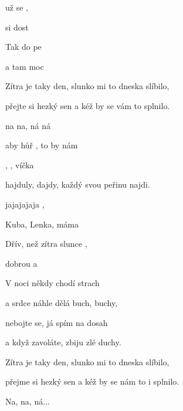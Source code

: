 

\zs
{} už se ,

 si dost  

Tak  do pe

a  tam moc 

Zítra je taky den, slunko mi to dneska slíbilo,

přejte si hezký sen a kéž by se vám to splnilo.

 na na,  ná  ná 

aby hůř , to by nám 
\ks

\zr
{}, ,  víčka 

hajduly, dajdy, každý svou peřinu najdi.

jajajajaja  ,

Kuba, Lenka, máma  

Dřív, než zítra slunce  ,

dobrou  a 
\kr

\zs
V noci někdy chodí strach

a srdce náhle dělá buch, buchy,

nebojte se, já spím na dosah

a když zavoláte, zbiju zlé duchy.

Zítra je taky den, slunko mi to dneska slíbilo,

přejme si hezký sen a kéž by se nám to i splnilo.

Na, na, ná...
\ks

\zr\kr

\kp





